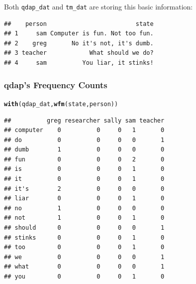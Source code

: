 \documentclass{article}\usepackage[]{graphicx}\usepackage[]{color}
\makeatletter
\newcommand{\hlstd}[1]{\textcolor[rgb]{0.345,0.345,0.345}{#1}}%
\newcommand{\hlkwd}[1]{\textcolor[rgb]{0.737,0.353,0.396}{\textbf{#1}}}%
\newenvironment{kframe}{%
 \def\at@end@of@kframe{}%
 \ifinner\ifhmode%
  \def\at@end@of@kframe{\end{minipage}}%
  \begin{minipage}{\columnwidth}%
 \fi\fi%
 \def\FrameCommand##1{\hskip\@totalleftmargin \hskip-\fboxsep
 \colorbox{shadecolor}{##1}\hskip-\fboxsep
     \hskip-\linewidth \hskip-\@totalleftmargin \hskip\columnwidth}%
 \MakeFramed {\advance\hsize-\width
   \@totalleftmargin\z@ \linewidth\hsize
   \@setminipage}}%
 {\par\unskip\endMakeFramed%
 \at@end@of@kframe}
\newenvironment{knitrout}{}{} %
\makeatother
\begin{document}
 
\noindent Both \texttt{qdap\_dat} and \texttt{tm\_dat} are storing this basic information:

\begin{knitrout}
\color{fgcolor}\begin{kframe}
\begin{verbatim}
##    person                         state
## 1     sam Computer is fun. Not too fun.
## 2    greg       No it's not, it's dumb.
## 3 teacher            What should we do?
## 4     sam          You liar, it stinks!
\end{verbatim}
\end{kframe}
\end{knitrout}


\newpage

\subsubsection{qdap's Frequency Counts}

\begin{knitrout}
\color{fgcolor}\begin{kframe}
\begin{alltt}
\hlkwd{with}\hlstd{(qdap_dat,} \hlkwd{wfm}\hlstd{(state, person))}
\end{alltt}
\end{kframe}
\end{knitrout}


\begin{knitrout}
\color{fgcolor}\begin{kframe}
\begin{verbatim}
##          greg researcher sally sam teacher
## computer    0          0     0   1       0
## do          0          0     0   0       1
## dumb        1          0     0   0       0
## fun         0          0     0   2       0
## is          0          0     0   1       0
## it          0          0     0   1       0
## it's        2          0     0   0       0
## liar        0          0     0   1       0
## no          1          0     0   0       0
## not         1          0     0   1       0
## should      0          0     0   0       1
## stinks      0          0     0   1       0
## too         0          0     0   1       0
## we          0          0     0   0       1
## what        0          0     0   0       1
## you         0          0     0   1       0
\end{verbatim}
\end{kframe}
\end{knitrout}
\end{document}
